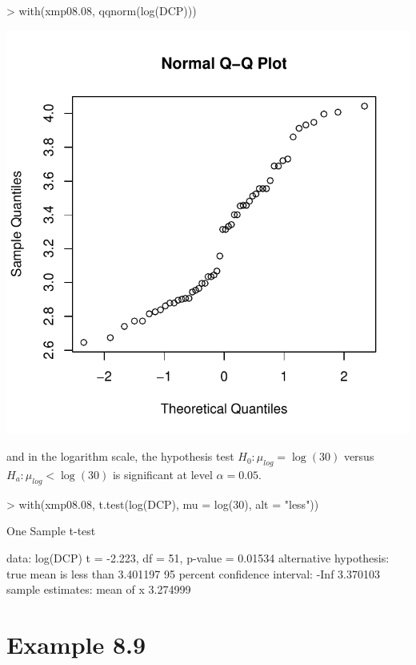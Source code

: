 \documentclass{book}
\begin{document}
\begin{center}
\begin{Schunk}
\begin{Sinput}
> with(xmp08.08, qqnorm(log(DCP)))
\end{Sinput}
\end{Schunk}
\includegraphics{Devore6-xmp0808c}
\end{center}
and in the logarithm scale, the hypothesis test
$H_0:\mu_\textit{log}=\log(30)$ versus $H_a:\mu_\textit{log}<
\log(30)$ is significant at level $\alpha=0.05$.
\begin{Schunk}
\begin{Sinput}
> with(xmp08.08, t.test(log(DCP), mu = log(30), alt = "less"))
\end{Sinput}
\begin{Soutput}
	One Sample t-test

data:  log(DCP) 
t = -2.223, df = 51, p-value = 0.01534
alternative hypothesis: true mean is less than 3.401197 
95 percent confidence interval:
     -Inf 3.370103 
sample estimates:
mean of x 
 3.274999 
\end{Soutput}
\end{Schunk}

\section{Example 8.9}
\label{sec:xmp0809}
\end{document}
